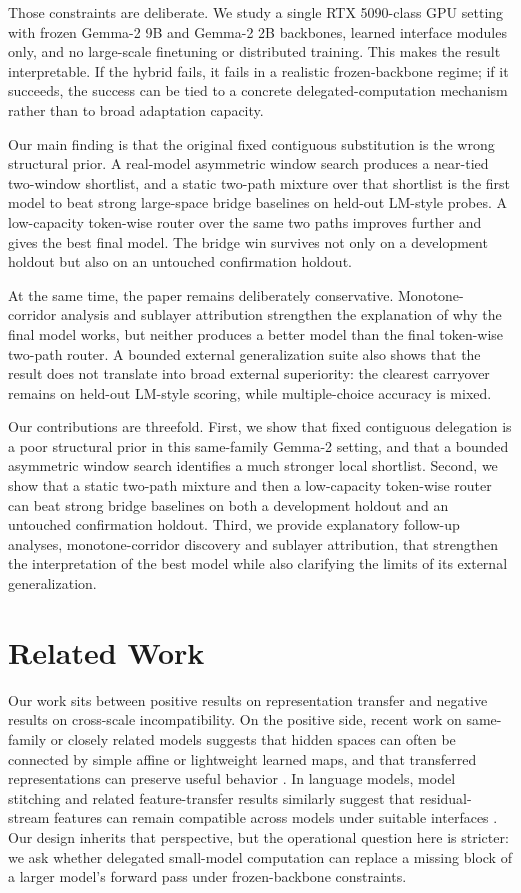 \documentclass[11pt]{article}
\begin{document}
Those constraints are deliberate. We study a single RTX 5090-class GPU setting with frozen Gemma-2 9B and Gemma-2 2B backbones, learned interface modules only, and no large-scale finetuning or distributed training. This makes the result interpretable. If the hybrid fails, it fails in a realistic frozen-backbone regime; if it succeeds, the success can be tied to a concrete delegated-computation mechanism rather than to broad adaptation capacity.

Our main finding is that the original fixed contiguous substitution is the wrong structural prior. A real-model asymmetric window search produces a near-tied two-window shortlist, and a static two-path mixture over that shortlist is the first model to beat strong large-space bridge baselines on held-out LM-style probes. A low-capacity token-wise router over the same two paths improves further and gives the best final model. The bridge win survives not only on a development holdout but also on an untouched confirmation holdout.

At the same time, the paper remains deliberately conservative. Monotone-corridor analysis and sublayer attribution strengthen the explanation of why the final model works, but neither produces a better model than the final token-wise two-path router. A bounded external generalization suite also shows that the result does not translate into broad external superiority: the clearest carryover remains on held-out LM-style scoring, while multiple-choice accuracy is mixed.

Our contributions are threefold. First, we show that fixed contiguous delegation is a poor structural prior in this same-family Gemma-2 setting, and that a bounded asymmetric window search identifies a much stronger local shortlist. Second, we show that a static two-path mixture and then a low-capacity token-wise router can beat strong bridge baselines on both a development holdout and an untouched confirmation holdout. Third, we provide explanatory follow-up analyses, monotone-corridor discovery and sublayer attribution, that strengthen the interpretation of the best model while also clarifying the limits of its external generalization.

\section{Related Work}

Our work sits between positive results on representation transfer and negative results on cross-scale incompatibility. On the positive side, recent work on same-family or closely related models suggests that hidden spaces can often be connected by simple affine or lightweight learned maps, and that transferred representations can preserve useful behavior \citep{bello2025lrt,chen2025stitching}. In language models, model stitching and related feature-transfer results similarly suggest that residual-stream features can remain compatible across models under suitable interfaces \citep{chen2025stitching}. Our design inherits that perspective, but the operational question here is stricter: we ask whether delegated small-model computation can replace a missing block of a larger model's forward pass under frozen-backbone constraints.
\end{document}
